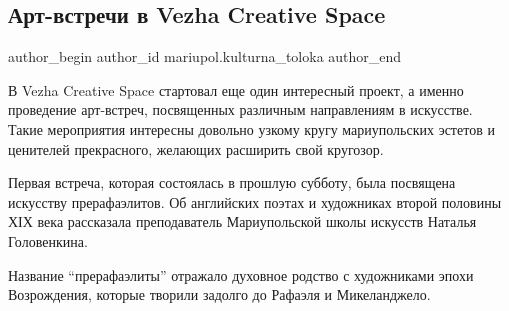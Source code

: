  
 
 
 
 

\subsection{Арт-встречи в Vezha Creative Space}
\label{sec:20_01_2019.fb.mariupol.kulturna_toloka.1.art_vstrechi_vezha_creative_space}

\ifcmt
 author_begin
   author_id mariupol.kulturna_toloka
 author_end
\fi

В Vezha Creative Space стартовал еще один интересный проект, а именно
проведение арт-встреч, посвященных различным направлениям в искусстве. Такие
мероприятия интересны довольно узкому кругу мариупольских эстетов и ценителей
прекрасного, желающих расширить свой кругозор. 

Первая встреча, которая состоялась в прошлую субботу, была посвящена искусству
прерафаэлитов. Об английских поэтах и художниках второй половины ХІХ века
рассказала преподаватель Мариупольской школы искусств Наталья Головенкина. 

Название \enquote{прерафаэлиты} отражало духовное родство с художниками эпохи
Возрождения, которые творили задолго до Рафаэля и Микеланджело.

